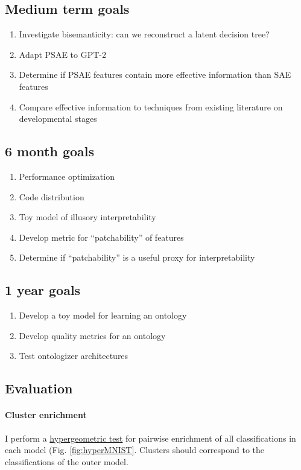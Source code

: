 \subsection{Medium term goals}
\begin{enumerate}
    \item Investigate bisemanticity: can we reconstruct a latent decision tree?
    \cite{aytekin2022neural}
    \item Adapt PSAE to GPT-2
    \item Determine if PSAE features contain more effective information than SAE features
    \item Compare effective information to techniques from 
    existing literature on developmental stages\cite{hoogland2024developmental}
\end{enumerate}

\subsection{6 month goals}
\begin{enumerate}
    \item Performance optimization
    \item Code distribution
    \item Toy model of illusory interpretability
    \item Develop metric for ``patchability'' of features
    \item Determine if ``patchability'' is a useful proxy for interpretability
\end{enumerate}

\subsection{1 year goals}
\begin{enumerate}
    \item Develop a toy model for learning an ontology
    \item Develop quality metrics for an ontology
    \item Test ontologizer architectures
\end{enumerate}

\subsection{Evaluation}

\paragraph{Cluster enrichment}
I perform a \hyperlink{https://en.wikipedia.org/wiki/Hypergeometric_distribution#Hypergeometric_test}{hypergeometric test}
for pairwise enrichment of all classifications in each model (Fig. \ref{fig:hyperMNIST}.
Clusters should correspond to the classifications of the outer model.


